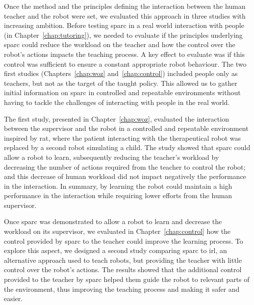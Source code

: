 Once the method and the principles defining the interaction between the human teacher and the robot were set, we evaluated this approach in three studies with increasing ambition. Before testing \gls{sparc} in a real world interaction with people (in Chapter~\ref{chap:tutoring}), we needed to evaluate if the principles underlying \gls{sparc} could reduce the workload on the teacher and how the control over the robot's actions impacts the teaching process. A key effect to evaluate was if this control was sufficient to ensure a constant appropriate robot behaviour. The two first studies (Chapters~\ref{chap:woz} and~\ref{chap:control}) included people only as teachers, but not as the target of the taught policy. This allowed us to gather initial information on \gls{sparc} in controlled and repeatable environments without having to tackle the challenges of interacting with people in the real world.

The first study, presented in Chapter~\ref{chap:woz}, evaluated the interaction between the supervisor and the robot in a controlled and repeatable environment inspired by \gls{rat}, where the patient interacting with the therapeutical robot was replaced by a second robot simulating a child. The study showed that \gls{sparc} could allow a robot to learn, subsequently reducing the teacher's workload by decreasing the number of actions required from the teacher to control the robot; and this decrease of human workload did not impact negatively the performance in the interaction. In summary, by learning the robot could maintain a high performance in the interaction while requiring lower efforts from the human supervisor.

Once \gls{sparc} was demonstrated to allow a robot to learn and decrease the workload on its supervisor, we evaluated in Chapter~\ref{chap:control} how the control provided by \gls{sparc} to the teacher could improve the learning process. To explore this aspect, we designed a second study comparing \gls{sparc} to \gls{irl}, an alternative approach used to teach robots, but providing the teacher with little control over the robot's actions. The results showed that the additional control provided to the teacher by \gls{sparc} helped them guide the robot to relevant parts of the environment, thus improving the teaching process and making it safer and easier.

